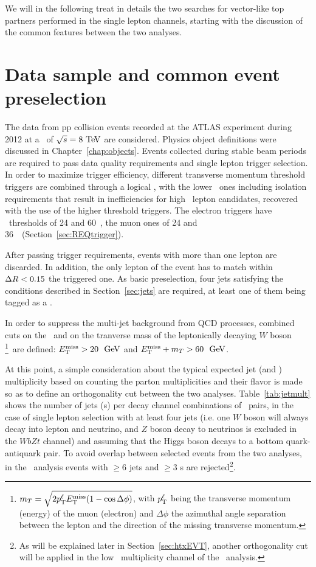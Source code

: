 We will in the following treat in details the two searches for vector-like 
top partners performed in the single lepton channels, starting with the
discussion of the common features between the two analyses.


\section{Data sample and common event preselection}\label{sec:presel}

The data from pp collision events recorded at the ATLAS experiment during
2012 at a \cme\ of $\rts=8\tev$ are considered. Physics object definitions 
were discussed in Chapter~\ref{chap:objects}.
Events collected during
stable beam periods are required to pass data quality requirements and
single lepton trigger selection. In order to maximize trigger
efficiency, different transverse momentum threshold triggers are combined
through a logical \OR, with the lower \pt\ ones including isolation requirements
that result in inefficiencies for high \pt\ lepton candidates, recovered with
the use of the higher threshold triggers. The electron triggers have
\pt\ thresholds of 24 and 60~\gev, the muon ones of 24 and 36~\gev\ (Section~\ref{sec:REQtrigger}).

After passing trigger requirements, events with more than one lepton are
discarded. In addition, the only lepton of the event has to match within $\dr<0.15$ the
triggered one. As basic preselection, four jets satisfying the conditions
described in Section~\ref{sec:jets} are required, at least one of them
being tagged as a \bjet.

In order to suppress the multi-jet background from QCD processes,
combined cuts on the \met\ and on the tranverse mass of the 
leptonically decaying $W$ boson \mt\footnote{$\mt = \sqrt{2 p^\ell_{\rm T} \met (1-\cos\Delta\phi)}$, with
$p^\ell_{\rm T}$  being the transverse momentum (energy) of the muon (electron) and $\Delta\phi$ the
azimuthal angle separation between the lepton and the direction of
the missing transverse momentum.}\ 
are defined: $\met>20~\gev$ and $\met+\mt>60~\gev$.

At this point, a simple consideration about the typical expected jet
(and \bjet) multiplicity based on counting the parton multiplicities and their 
flavor is made so as to define an orthogonality
cut between the two analyses. Table~\ref{tab:jetmult} shows the 
number of jets (\bjet s) per decay channel combinations of \TTbar\ pairs, 
in the case of single lepton selection with at least four jets
(i.e. one $W$ boson will always decay into lepton and neutrino,
and $Z$ boson decay to neutrinos is excluded in the $WbZt$ channel) and assuming that
the Higgs boson decays to a bottom quark-antiquark pair.
To avoid overlap between selected events from the two analyses, in the
\wbx\ analysis events with $\geq$6 jets and $\geq$3 \bjet s are 
rejected\footnote{As will be explained later in Section~\ref{sec:htxEVT}, another orthogonality
cut will be applied in the low \bjet\ multiplicity channel of the \htx\ analysis.}.

